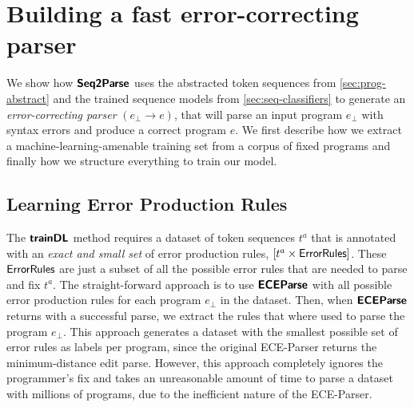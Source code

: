 \section{Building a fast error-correcting parser}
\label{sec:whole-system}

We show how $\bm{\mathsf{Seq2Parse}}$ uses the abstracted token sequences from
\autoref{sec:prog-abstract} and the trained sequence models from
\autoref{sec:seq-classifiers} to generate an \emph{error-correcting parser}
$(e_{\bot} \to e)$, that will parse an input program $e_{\bot}$ with syntax
errors and produce a correct program $e$. We first describe how we extract a
machine-learning-amenable training set from a corpus of fixed programs and
finally how we structure everything to train our model.


\subsection{Learning Error Production Rules}
\label{sec:whole-system:error-rules}

The $\bm{\mathsf{trainDL}}$ method requires a dataset of token sequences $t^a$ that is
annotated with an \emph{exact and small set} of error production rules, \ie
$[t^a \times \mathsf{ErrorRules}]$. These $\mathsf{ErrorRules}$ are just a subset of
all the possible error rules that are needed to parse and fix $t^a$. The
straight-forward approach is to use $\bm{\mathsf{ECEParse}}$ with all possible error
production rules for each program $e_{\bot}$ in the dataset. Then, when
$\bm{\mathsf{ECEParse}}$ returns with a successful parse, we extract the rules that where used
to parse the program $e_{\bot}$. This approach generates a dataset with the
smallest possible set of error rules as labels per program, since the original
ECE-Parser returns the minimum-distance edit parse. However, this approach
completely ignores the programmer's fix and takes an unreasonable amount of time
to parse a dataset with millions of programs, due to the inefficient nature of
the ECE-Parser.

